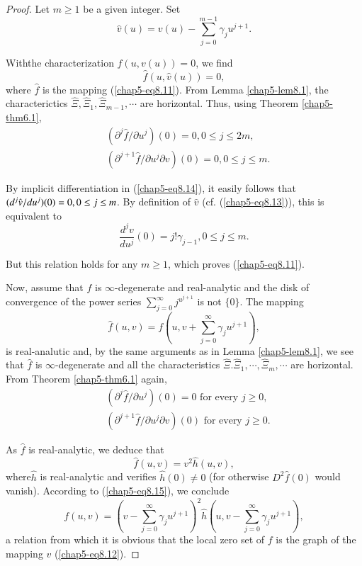 \begin{proof}
Let $m \geq 1$ be a given integer. Set
\begin{equation*}
\hat{v}(u) = v(u) - \sum\limits_{j=0}^{m-1} \gamma_{j}u^{j+1}.\tag{8.13}\label{chap5-eq8.13}
\end{equation*}

With\pageoriginale the characterization $f(u, v(u)) = 0$, we find
\begin{equation*}
\hat{f}(u, \hat{v}(u)) = 0,\tag{8.14}\label{chap5-eq8.14}
\end{equation*}
where $\hat{f}$ is the mapping (\ref{chap5-eq8.11}). From Lemma
\ref{chap5-lem8.1}, the characterictics $\hat{\Xi}, \hat{\Xi}_{1},
\hat{\Xi}_{m-1}, \cdots$ are horizontal. Thus, using Theorem
\ref{chap5-thm6.1},
\begin{align*}
& (\partial^{j} \hat{f} / \partial u^{j}) (0) = 0, 0 \leq j \leq 2m,\\
& (\partial^{j+1} \hat{f} / \partial u^{j} \partial v)(0) = 0, 0 \leq
  j \leq m.
\end{align*}

By implicit differentiation in (\ref{chap5-eq8.14}), it easily follows
that $(d^{j}\hat{v} / du^{j})\break (0) = 0, 0 \leq j \leq m$. By definition
of $\hat{v}$ (cf. (\ref{chap5-eq8.13})), this is equivalent to
$$
\frac{d^{j}v}{du^{j}} (0) = j! \gamma_{j-1}, 0 \leq j \leq m.
$$

But this relation holds for any $m \geq 1$, which proves
(\ref{chap5-eq8.11}).

Now, assume that $f$ is $\infty$-degenerate and real-analytic and the
disk of convergence of the power series $\sum\limits_{j=0}^{\infty}
j^{u^{j+1}}$ is not $\{0\}$. The mapping
\begin{equation*}
\hat{f}(u, v) = f \left(u, v + \sum\limits_{j=0}^{\infty} \gamma_{j} u^{j+1} \right),\tag{8.15}\label{chap5-eq8.15}
\end{equation*}
is real-analutic and, by the same arguments as in Lemma
\ref{chap5-lem8.1}, we see that $\hat{f}$ is $\infty$-degenerate and
all the characteristics $\hat{\Xi}. \hat{\Xi}_{1}, \cdots,
\hat{\Xi}_{m}, \cdots$ are horizontal. From Theorem \ref{chap5-thm6.1}
again,
\begin{align*}
& (\partial^{j} \hat{f}/ \partial u^{j})(0) = 0 \text{ for every } j
  \geq 0,\\
& (\partial^{j+1} \hat{f} / \partial u^{j} \partial v) (0) \text{ for
    every } j \geq 0.
\end{align*}

As $\hat{f}$ is real-analytic, we deduce that
$$
\hat{f}(u, v) = v^{2}\hat{h}(u, v),
$$
where\pageoriginale $\hat{h}$ is real-analytic and verifies
$\hat{h}(0) \neq 0$ (for otherwise $D^{2}\hat{f}(0)$ would
vanish). According to (\ref{chap5-eq8.15}), we conclude
$$
f(u, v) = (v - \sum\limits_{j=0}^{\infty} \gamma_{j} u^{j+1})^{2}
\hat{h}(u, v - \sum\limits_{j=0}^{\infty} \gamma_{j} u^{j+1}),
$$
a relation from which it is obvious that the local zero set of $f$ is
the graph of the mapping $v$ (\ref{chap5-eq8.12}).
\end{proof}

